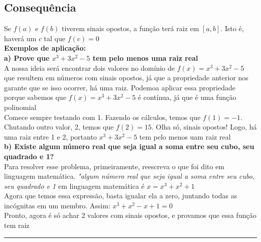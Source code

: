 \documentclass{article}
\begin{document}
\subsection{Consequência}
Se $f(a)$ e $f(b)$ tiverem sinais opostos, a função terá raiz em $[a, b]$. Isto é, haverá um $c$ tal que $f(c) = 0$
\\[10pt]
\textbf{Exemplos de aplicação:}
\\[10pt]
\textbf{a) Prove que $x^{3} + 3x^{2} - 5$ tem pelo menos uma raiz real}
\\[10pt]
A nossa ideia será encontrar dois valores no domínio de $f(x) = x^{3} + 3x^{2} - 5$ que resultem em números com sinais opostos, já que a propriedade anterior nos garante que se isso ocorrer, há uma raiz. Podemoa aplicar essa propriedade porque sabemos que $f(x) = x^{3} + 3x^{2} - 5$ é contínua, já que é uma função polinomial
\\[10pt]
Comece sempre testando com 1. Fazendo os cálculos, temos que $f(1) = -1$. Chutando outro valor, 2, temos que $f(2) = 15$. Olha só, sinais opostos! Logo, há uma raiz entre 1 e 2, portanto $x^{3} + 3x^{2} - 5$ tem pelo menos uam raiz real
\\[10pt]
\textbf{b) Existe algum número real que seja igual a soma entre seu cubo, seu quadrado e 1?}
\\[10pt]
Para resolver esse problema, primeiramente, reescreva o que foi dito em linguagem matemática. \emph{"algum número real que seja igual a soma entre seu cubo, seu quadrado e 1} em linguagem matemática é $x = x^{3} + x^{2} + 1$
\\[5pt]
Agora que temos essa expressão, basta igualar ela a zero, juntando todas as incógnitas em um membro. Assim: $x^{3} + x^{2} - x + 1 = 0$
\\[5pt]
Pronto, agora é só achar 2 valores com sinais opostos, e provamos que essa função tem raiz 
\vspace{15pt}
\hrule
\end{document}
